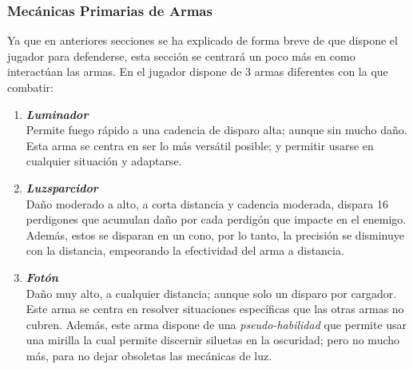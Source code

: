     \subsubsection{Mecánicas Primarias de Armas}
        Ya que en anteriores secciones se ha explicado de forma breve de que dispone el jugador para defenderse, esta sección se centrará un poco más en como interactúan las armas.
        En \gameTitle el jugador dispone de 3 armas diferentes con la que combatir:
            \begin{enumerate}
                \item \textbf{\textit{Luminador}} \\
                Permite fuego rápido a una cadencia de disparo alta; aunque sin mucho daño. Esta arma se centra en ser lo más versátil posible; y permitir usarse en cualquier situación y adaptarse.
                \item \textbf{\textit{Luzsparcidor}} \\
                Daño moderado a alto, a corta distancia y cadencia moderada, dispara 16 perdigones que acumulan daño por cada perdigón que impacte en el enemigo. Además, estos se disparan en un cono, por lo tanto, la precisión se disminuye con la distancia, empeorando la efectividad del arma a distancia.
                \item \textbf{\textit{Fotón}} \\
                Daño muy alto, a cualquier distancia; aunque solo un disparo por cargador. Este arma se centra en resolver situaciones específicas que las otras armas no cubren. Además, este arma dispone de una \textit{pseudo-habilidad} que permite usar una mirilla la cual permite discernir siluetas en la oscuridad; pero no mucho más, para no dejar obsoletas las mecánicas de luz.
            \end{enumerate}

